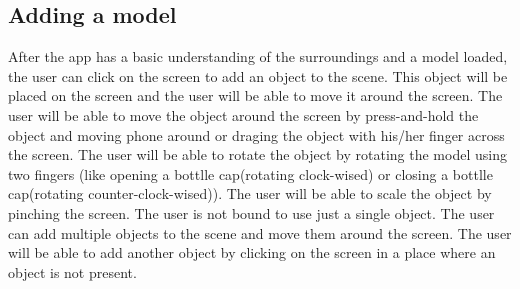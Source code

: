 \pagebreak

\subsection{Adding a model}
After the app has a basic understanding of the surroundings and a model loaded, the user can click on the screen to add an object to the scene. This object will be placed on the screen and the user will be able to move it around the screen. The user will be able to move the object around the screen by press-and-hold the object and moving phone around or draging the object with his/her finger across the screen. The user will be able to rotate the object by rotating the model using two fingers (like opening a bottlle cap(rotating clock-wised) or closing a bottlle cap(rotating counter-clock-wised)). The user will be able to scale the object by pinching the screen. The user is not bound to use just a single object. The user can add multiple objects to the scene and move them around the screen. The user will be able to add another object by clicking on the screen in a place where an object is not present.
